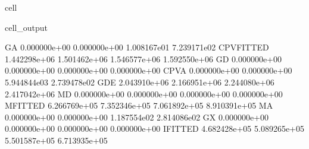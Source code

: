 \documentclass[letterpaper,10pt,english]{jupyterBook}
\begin{document}
\begin{sphinxuseclass}{cell}
\begin{sphinxVerbatimOutput}
\begin{sphinxuseclass}{cell_output}
\begin{sphinxVerbatim}[commandchars=\\\{\}]
G\PYGZus{}A         0.000000e+00  0.000000e+00 \PYGZhy{}1.008167e\PYGZhy{}01  7.239171e\PYGZhy{}02   
CPV\PYGZus{}FITTED  1.442298e+06  1.501462e+06  1.546577e+06  1.592550e+06   
G\PYGZus{}D         0.000000e+00  0.000000e+00  0.000000e+00  0.000000e+00   
CPV\PYGZus{}A       0.000000e+00  0.000000e+00 \PYGZhy{}5.944844e\PYGZhy{}03 \PYGZhy{}2.739478e\PYGZhy{}02   
GDE         2.043910e+06  2.166951e+06  2.244080e+06  2.417042e+06   
M\PYGZus{}D         0.000000e+00  0.000000e+00  0.000000e+00  0.000000e+00   
M\PYGZus{}FITTED    6.266769e+05  7.352346e+05  7.061892e+05  8.910391e+05   
M\PYGZus{}A         0.000000e+00  0.000000e+00  1.187554e\PYGZhy{}02  2.814086e\PYGZhy{}02   
G\PYGZus{}X         0.000000e+00  0.000000e+00  0.000000e+00  0.000000e+00   
I\PYGZus{}FITTED    4.682428e+05  5.089265e+05  5.501587e+05  6.713935e+05   


\end{sphinxVerbatim}
\end{sphinxuseclass}
\end{sphinxVerbatimOutput}
\end{sphinxuseclass}
\end{document}
